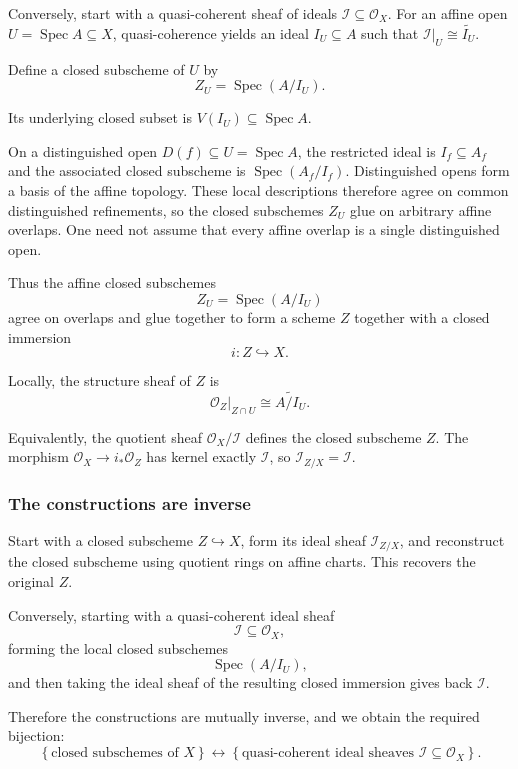 Conversely, start with a quasi-coherent sheaf of ideals
\(\mathcal I\subseteq\mathcal{O}_X\). For an affine open
\(U=\operatorname{Spec}A\subseteq X\), quasi-coherence yields an ideal
\(I_U\subseteq A\) such that \(\mathcal I|_U\cong\widetilde{I_U}\).

Define a closed subscheme of \(U\) by
\[
Z_U=\operatorname{Spec}(A/I_U).
\]

Its underlying closed subset is \(V(I_U)\subseteq\operatorname{Spec}A\).

On a distinguished open $D(f)\subseteq U=\operatorname{Spec}A$,
the restricted ideal is $I_f\subseteq A_f$ and the associated closed
subscheme is $\operatorname{Spec}(A_f/I_f)$. Distinguished opens
form a basis of the affine topology. These local descriptions
therefore agree on common distinguished refinements, so the closed
subschemes $Z_U$ glue on arbitrary affine overlaps. One need not
assume that every affine overlap is a single distinguished open.

Thus the affine closed subschemes
\[
Z_U=\operatorname{Spec}(A/I_U)
\]
agree on overlaps and glue together to form a scheme \(Z\) together with a closed immersion
\[
i:Z\hookrightarrow X.
\]

Locally, the structure sheaf of \(Z\) is
\[
\mathcal{O}_Z|_{Z\cap U}
\cong
\widetilde{A/I_U}.
\]

Equivalently, the quotient sheaf \(\mathcal{O}_X/\mathcal I\)
defines the closed subscheme \(Z\). The morphism
\(\mathcal{O}_X\longrightarrow i_*\mathcal{O}_Z\) has kernel exactly
\(\mathcal I\), so \(\mathcal{I}_{Z/X}=\mathcal I\).

\subsubsection{The constructions are inverse}

Start with a closed subscheme \(Z\hookrightarrow X\), form its
ideal sheaf \(\mathcal{I}_{Z/X}\), and reconstruct the closed subscheme
using quotient rings on affine charts. This recovers the original \(Z\).

Conversely, starting with a quasi-coherent ideal sheaf
\[
\mathcal{I}\subseteq \mathcal{O}_X,
\]
forming the local closed subschemes
\[
\operatorname{Spec}(A/I_U),
\]
and then taking the ideal sheaf of the resulting closed immersion gives back \(\mathcal{I}\).

Therefore the constructions are mutually inverse, and we obtain the required bijection:
\[
\boxed{
	\left\{
	\text{closed subschemes of }X
	\right\}
	\longleftrightarrow
	\left\{
	\text{quasi-coherent ideal sheaves }
	\mathcal{I}\subseteq \mathcal{O}_X
	\right\}.
}
\]

